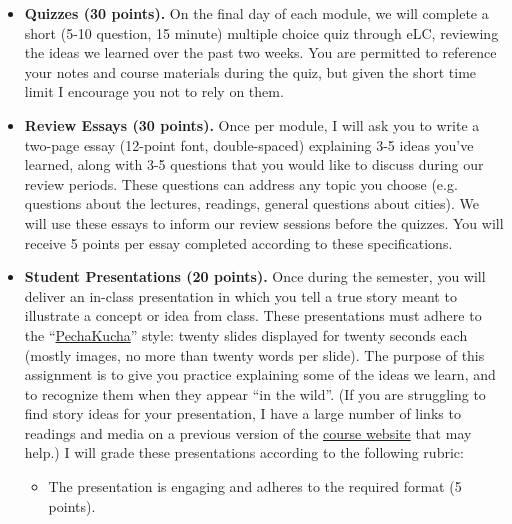 \documentclass[11pt, letterpaper]{article}
\begin{document}
\begin{itemize}
	\item \textbf{Quizzes (30 points).} On the final day of each module, we will complete a short (5-10 question, 15 minute) multiple choice quiz through eLC, reviewing the ideas we learned over the past two weeks. You are permitted to reference your notes and course materials during the quiz, but given the short time limit I encourage you not to rely on them.
	\item \textbf{Review Essays (30 points).} Once per module, I will ask you to write a two-page essay (12-point font, double-spaced) explaining 3-5 ideas you've learned, along with 3-5 questions that you would like to discuss during our review periods. These questions can address any topic you choose (e.g. questions about the lectures, readings, general questions about cities). We will use these essays to inform our review sessions before the quizzes. You will receive 5 points per essay completed according to these specifications.
	\item \textbf{Student Presentations (20 points).} Once during the semester, you will deliver an in-class presentation in which you tell a true story meant to illustrate a concept or idea from class. These presentations must adhere to the ``\href{https://en.wikipedia.org/wiki/PechaKucha}{PechaKucha}'' style: twenty slides displayed for twenty seconds each (mostly images, no more than twenty words per slide). The purpose of this assignment is to give you practice explaining some of the ideas we learn, and to recognize them when they appear ``in the wild''. (If you are struggling to find story ideas for your presentation, I have a large number of links to readings and media on a previous version of the \href{https://joeornstein.github.io/pols-4641/}{course website} that may help.) I will grade these presentations according to the following rubric:
	\begin{itemize}
		\item The presentation is engaging and adheres to the required format (5 points).

\end{itemize}
\end{itemize}
\end{document}

